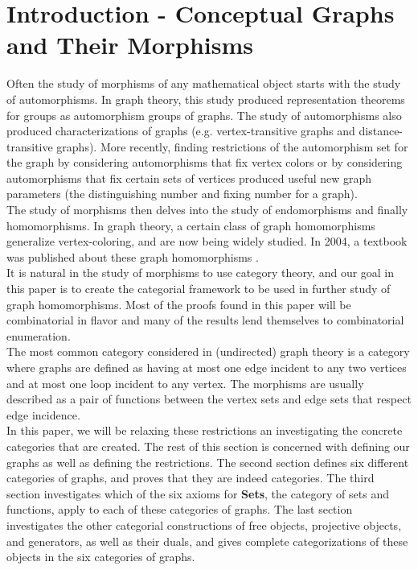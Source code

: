 \documentclass[11pt]{article}
\begin{document}
\section{Introduction - Conceptual Graphs and Their Morphisms}
\indent Often the study of morphisms of any mathematical object starts with the study of automorphisms. In graph theory, this study produced representation theorems for groups as automorphism groups of graphs. The study of automorphisms also produced characterizations of graphs (e.g. vertex-transitive graphs and distance-transitive graphs). More recently, finding restrictions of the automorphism set for the graph by considering automorphisms that fix vertex colors or by considering automorphisms that fix certain sets of vertices produced useful new graph parameters (the distinguishing number \cite{Albertson} and fixing number \cite{Courtney} for a graph).\\
\indent The study of morphisms then delves into the study of endomorphisms and finally homomorphisms. In graph theory, a certain class of graph homomorphisms generalize vertex-coloring, and are now being widely studied. In 2004, a textbook was published about these graph homomorphisms \cite{HN2004}.\\
\indent It is natural in the study of morphisms to use category theory, and our goal in this paper is to create the categorial framework to be used in further study of graph homomorphisms. Most of the proofs found in this paper will be combinatorial in flavor and many of the results lend themselves to combinatorial enumeration.\\
\indent The most common category considered in (undirected) graph theory is a category where graphs are defined as having at most one edge incident to any two vertices and at most one loop incident to any vertex. The morphisms are usually described as a pair of functions between the vertex sets and edge sets that respect edge incidence.\\
\indent In this paper, we will be relaxing these restrictions an investigating the concrete categories that are created. The rest of this section is concerned with defining our graphs as well as defining the restrictions. The second section defines six different categories of graphs, and proves that they are indeed categories. The third section investigates which of the six axioms for \textbf{Sets}, the category of sets and functions, apply to each of these categories of graphs. The last section investigates the other categorial constructions of free objects, projective objects, and generators, as well as their duals, and gives complete categorizations of these objects in the six categories of graphs.\\
\end{document}
